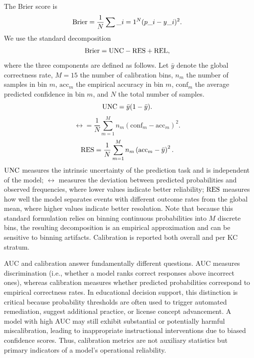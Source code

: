 The Brier score is
\begin{equation}
\mathrm{Brier} = \frac{1}{N}\sum\_{i=1}^{N}(p\_i-y\_i)^2.
\end{equation}
We use the standard decomposition
\begin{equation}
\mathrm{Brier} = \mathrm{UNC} - \mathrm{RES} + \mathrm{REL},
\end{equation}
where the three components are defined as follows. Let $\bar{y}$ denote the global correctness rate, $M=15$ the number of calibration bins, $n_m$ the number of samples in bin $m$, $\mathrm{acc}_m$ the empirical accuracy in bin $m$, $\mathrm{conf}_m$ the average predicted confidence in bin $m$, and $N$ the total number of samples.
\begin{equation}
\mathrm{UNC} = \bar{y}(1-\bar{y}).
\end{equation}
\begin{equation}
\rel = \frac{1}{N}\sum_{m=1}^{M} n_m
\left(\mathrm{conf}_m - \mathrm{acc}_m\right)^2.
\end{equation}
\begin{equation}
\mathrm{RES} = \frac{1}{N}\sum_{m=1}^{M} n_m
\left(\mathrm{acc}_m - \bar{y}\right)^2.
\end{equation}
$\mathrm{UNC}$ measures the intrinsic uncertainty of the prediction task and is independent of the model; $\rel$ measures the deviation between predicted probabilities and observed frequencies, where lower values indicate better reliability; $\mathrm{RES}$ measures how well the model separates events with different outcome rates from the global mean, where higher values indicate better resolution. Note that because this standard formulation relies on binning continuous probabilities into $M$ discrete bins, the resulting decomposition is an empirical approximation and can be sensitive to binning artifacts.
Calibration is reported both overall and per KC stratum.

AUC and calibration answer fundamentally different questions. AUC measures discrimination (i.e., whether a model ranks correct responses above incorrect ones), whereas calibration measures whether predicted probabilities correspond to empirical correctness rates. In educational decision support, this distinction is critical because probability thresholds are often used to trigger automated remediation, suggest additional practice, or license concept advancement. A model with high AUC may still exhibit substantial or potentially harmful miscalibration, leading to inappropriate instructional interventions due to biased confidence scores. Thus, calibration metrics are not auxiliary statistics but primary indicators of a model's operational reliability.

